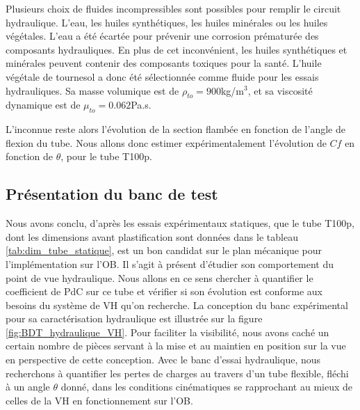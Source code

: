 Plusieurs choix de fluides incompressibles sont possibles pour remplir le circuit hydraulique. L'eau, les huiles synthétiques, les huiles minérales ou les huiles végétales. L'eau a été écartée pour prévenir une corrosion prématurée des composants hydrauliques. En plus de cet inconvénient, les huiles synthétiques et minérales peuvent contenir des composants toxiques pour la santé. L'huile végétale de tournesol a donc été sélectionnée comme fluide pour les essais hydrauliques. 
Sa masse volumique est de $\rho_{to} = 900$kg/m$^3$, et sa viscosité dynamique est de $\mu_{to}=0.062$Pa.s.

L'inconnue reste alors l'évolution de la section flambée en fonction de l'angle de flexion du tube. Nous allons donc estimer expérimentalement l'évolution de $Cf$ en fonction de $\theta$, pour le tube T100p.
	\subsection{Présentation du banc de test}
	\label{subsec:4.4.1_Présentation du banc de test}    
Nous avons conclu, d'après les essais expérimentaux statiques, que le tube T100p, dont les dimensions avant plastification sont données dans le tableau \ref{tab:dim_tube_statique}, est un bon candidat sur le plan mécanique pour l'implémentation sur l'OB. Il s'agit à présent d'étudier son comportement du point de vue hydraulique. Nous allons en ce sens chercher à quantifier le coefficient de PdC sur ce tube et vérifier si son évolution est conforme aux besoins du système de VH qu'on recherche. La conception du banc expérimental pour sa caractérisation hydraulique est illustrée sur la figure \ref{fig:BDT_hydraulique_VH}. Pour faciliter la visibilité, nous avons caché un certain nombre de pièces servant à la mise et au maintien en position sur la vue en perspective de cette conception. Avec le banc d'essai hydraulique, nous recherchons à quantifier les pertes de charges au travers d'un tube flexible, fléchi à un angle $\theta$ donné, dans les conditions cinématiques se rapprochant au mieux de celles de la VH en fonctionnement sur l'OB.

